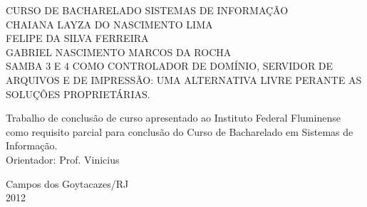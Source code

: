 \begin{titlepage}
 \begin{figure}[ht]
 \centering
 \end{figure}
 \begin{center}
   	{\large CURSO DE BACHARELADO SISTEMAS DE INFORMAÇÃO} \\ [3.5cm]
	{\large CHAIANA LAYZA DO NASCIMENTO LIMA} \\
	{\large FELIPE DA SILVA FERREIRA} \\	
	{\large GABRIEL NASCIMENTO MARCOS DA ROCHA} \\ [4cm]
   	{\large SAMBA 3 E 4 COMO CONTROLADOR DE DOMÍNIO, SERVIDOR DE ARQUIVOS E DE IMPRESSÃO: UMA ALTERNATIVA LIVRE PERANTE AS SOLUÇÕES PROPRIETÁRIAS.}\\ [2cm]
   \hspace{.45\textwidth} %
   \begin{minipage}{0.5\textwidth}
   \begin{espacosimples}
        Trabalho de conclusão de curso apresentado ao Instituto Federal Fluminense como requisito parcial para conclusão do Curso de Bacharelado em Sistemas de Informação.\\[1.5cm]
        Orientador: Prof. Vinicius
    \end{espacosimples}
    \end{minipage}
   \vfill
   {\large Campos dos Goytacazes/RJ} \\
   {\large 2012}
 \end{center}
\end{titlepage}
